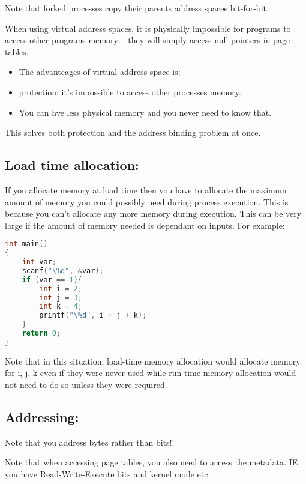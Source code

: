 \documentclass[10pt,\jkfside,a4paper]{article}
\begin{document}
Note that forked processes copy their parents address spaces bit-for-bit.

When using virtual address spaces, it is physically impossible for programs to access other programs 
memory -- they will simply access null pointers in page tables.

\begin{itemize}

\item The advanteages of virtual address space is:

\item protection: it's impossible to access other processes memory. 

\item You can hve less physical memory and you never need to know that.

\end{itemize}

This solves both protection and the address binding problem at once.

\subsection*{Load time allocation:}

If you allocate memory at load time then you have to allocate the maximum amount of memory 
you could possibly need during process execution. This is because you can't allocate any more 
memory during execution. This can be very large if the amount of memory needed is dependant 
on inputs. For example:
\begin{lstlisting}[language=C]
int main()
{
	int var;
	scanf("\%d", &var);
	if (var == 1){
		int i = 2;
		int j = 3;
		int k = 4;
		printf("\%d", i + j + k);
	}
	return 0;
}
\end{lstlisting}

Note that in this situation, load-time memory allocation would allocate memory for i, j, k 
even if they were never used while run-time memory allocation would not need to do so 
unless they were required.

\subsection*{Addressing:}

Note that you address bytes rather than bits!!

Note that when accessing page tables, you also need to access the metadata. IE you have 
Read-Write-Execute bits and kernel mode etc.
\end{document}
